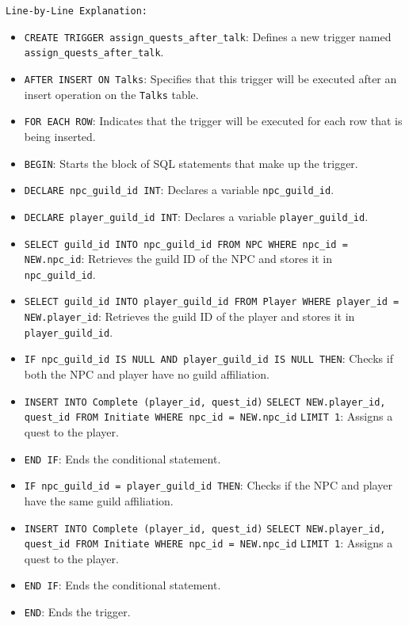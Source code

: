 \documentclass{article}
\begin{document}
\texttt{Line-by-Line Explanation:}
\begin{itemize}
    \item \lstinline|CREATE TRIGGER assign_quests_after_talk|: Defines a new trigger named \linebreak \lstinline|assign_quests_after_talk|.
    \item \lstinline|AFTER INSERT ON Talks|: Specifies that this trigger will be executed after an insert operation on the \lstinline|Talks| table.
    \item \lstinline|FOR EACH ROW|: Indicates that the trigger will be executed for each row that is being inserted.
    \item \lstinline|BEGIN|: Starts the block of SQL statements that make up the trigger.
    \item \lstinline|DECLARE npc_guild_id INT|: Declares a variable \lstinline|npc_guild_id|.
    \item \lstinline|DECLARE player_guild_id INT|: Declares a variable \lstinline|player_guild_id|.
    \item \lstinline|SELECT guild_id INTO npc_guild_id FROM NPC WHERE npc_id = NEW.npc_id|: Retrieves the guild ID of the NPC and stores it in \lstinline|npc_guild_id|.
    \item \lstinline|SELECT guild_id INTO player_guild_id FROM Player WHERE player_id = NEW.player_id|: Retrieves the guild ID of the player and stores it in \lstinline|player_guild_id|.
    \item \lstinline|IF npc_guild_id IS NULL AND player_guild_id IS NULL THEN|: Checks if both the NPC and player have no guild affiliation.
    \item \lstinline|INSERT INTO Complete (player_id, quest_id)| \linebreak \lstinline|SELECT NEW.player_id, quest_id FROM Initiate WHERE npc_id = NEW.npc_id| \linebreak \lstinline|LIMIT 1|: Assigns a quest to the player.
    \item \lstinline|END IF|: Ends the conditional statement.
    \item \lstinline|IF npc_guild_id = player_guild_id THEN|: Checks if the NPC and player have the same guild affiliation.
    \item \lstinline|INSERT INTO Complete (player_id, quest_id)| \linebreak \lstinline|SELECT NEW.player_id, quest_id FROM Initiate WHERE npc_id = NEW.npc_id| \linebreak \lstinline|LIMIT 1|: Assigns a quest to the player.
    \item \lstinline|END IF|: Ends the conditional statement.
    \item \lstinline|END|: Ends the trigger.
\end{itemize}
\end{document}
